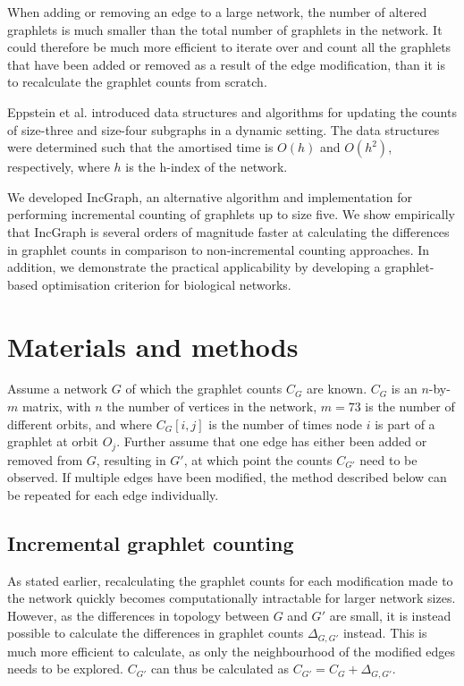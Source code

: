 When adding or removing an edge to a large network, the number of altered graphlets is much smaller than the total number of graphlets in the network. It could therefore be much more efficient to iterate over and count all the graphlets that have been added or removed as a result of the edge modification, than it is to recalculate the graphlet counts from scratch. 

Eppstein et al. introduced data structures and algorithms for updating the counts of size-three\cite{eppstein_hindexgraphits_2009} and size-four\cite{eppstein_extendeddynamicsubgraph_2012} subgraphs in a dynamic setting. The data structures were determined such that the amortised time is $O(h)$ and $O(h^2)$, respectively, where $h$ is the h-index of the network\cite{hirsch_indexquantifyindividual_2005}.

We developed IncGraph, an alternative algorithm and implementation for performing incremental counting of graphlets up to size five. We show empirically that IncGraph is several orders of magnitude faster at calculating the differences in graphlet counts in comparison to non-incremental counting approaches. In addition, we demonstrate the practical applicability by developing a graphlet-based optimisation criterion for biological networks.


\section*{Materials and methods}
Assume a network $G$ of which the graphlet counts $C_G$ are known. $C_G$ is an $n$-by-$m$ matrix, with $n$ the number of vertices in the network, $m = 73$ is the number of different orbits, and where $C_G[i,j]$ is the number of times node $i$ is part of a graphlet at orbit $O_j$. 
Further assume that one edge has either been added or removed from $G$, resulting in $G'$, at which point the counts $C_{G'}$ need to be observed. If multiple edges have been modified, the method described below can be repeated for each edge individually.

\subsection*{Incremental graphlet counting}
As stated earlier, recalculating the graphlet counts for each modification made to the network quickly becomes computationally intractable for larger network sizes. However, as the differences in topology between $G$ and $G'$ are small, it is instead possible to calculate the differences in graphlet counts $\Delta_{G, G'}$ instead. This is much more efficient to calculate, as only the neighbourhood of the modified edges needs to be explored. $C_{G'}$ can thus be calculated as $C_{G'} = C_G + \Delta_{G,G'}$.


